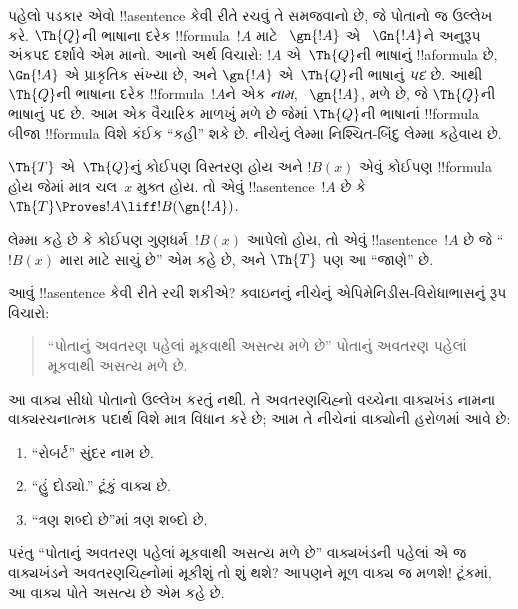 \documentclass[../../../include/open-logic-section]{subfiles}
\begin{document}
પહેલો પડકાર એવો
!!a{sentence} કેવી રીતે
રચવું તે સમજવાનો છે,
જે પોતાનો જ ઉલ્લેખ કરે.
$\Th{Q}$ની ભાષાના દરેક
!!{formula}~$!A$ માટે
~$\gn{!A}$ એ
~$\Gn{!A}$ને અનુરૂપ
અંકપદ દર્શાવે એમ માનો.
આનો અર્થ વિચારો:
$!A$ એ~$\Th{Q}$ની
ભાષાનું !!a{formula} છે,
$\Gn{!A}$ એ પ્રાકૃતિક
સંખ્યા છે, અને
$\gn{!A}$ એ~$\Th{Q}$ની
ભાષાનું \emph{પદ} છે.
આથી $\Th{Q}$ની ભાષાના
દરેક !!{formula}~$!A$ને
એક \emph{નામ},
~$\gn{!A}$, મળે છે,
જે $\Th{Q}$ની ભાષાનું
પદ છે. આમ એક વૈચારિક
માળખું મળે છે જેમાં
$\Th{Q}$ની ભાષાનાં
!!{formula} બીજા
!!{formula} વિશે કંઈક
``કહી'' શકે છે.
નીચેનું લેમ્મા નિશ્ચિત-બિંદુ
લેમ્મા કહેવાય છે.

\begin{lem}
$\Th{T}$ એ~$\Th{Q}$નું
કોઈપણ વિસ્તરણ હોય અને
$!B(x)$ એવું કોઈપણ
!!{formula} હોય જેમાં
માત્ર ચલ~$x$ મુક્ત હોય.
તો એવું !!a{sentence}~$!A$
છે કે
$\Th{T} \Proves!A \liff !B(\gn{!A})$.
\end{lem}

લેમ્મા કહે છે કે કોઈપણ
ગુણધર્મ~$!B(x)$ આપેલો
હોય, તો એવું
!!a{sentence}~$!A$ છે
જે ``$!B(x)$ મારા માટે
સાચું છે'' એમ કહે છે,
અને $\Th{T}$ પણ આ
``જાણે'' છે.

આવું !!a{sentence} કેવી
રીતે રચી શકીએ?
ક્વાઇનનું નીચેનું
એપિમેનિડીસ-વિરોધાભાસનું
રૂપ વિચારો:
\begin{quote}
``પોતાનું અવતરણ પહેલાં
મૂકવાથી અસત્ય મળે છે''
પોતાનું અવતરણ પહેલાં
મૂકવાથી અસત્ય મળે છે.
\end{quote}
આ વાક્ય સીધો પોતાનો
ઉલ્લેખ કરતું નથી.
તે અવતરણચિહ્નો વચ્ચેના
વાક્યખંડ નામના વાક્યરચનાત્મક
પદાર્થ વિશે માત્ર વિધાન
કરે છે; આમ તે નીચેનાં
વાક્યોની હરોળમાં આવે છે:
\begin{enumerate}
\item ``રોબર્ટ'' સુંદર નામ છે.
\item ``હું દોડ્યો.'' ટૂંકું વાક્ય છે.
\item ``ત્રણ શબ્દો છે''માં ત્રણ શબ્દો છે.
\end{enumerate}
પરંતુ ``પોતાનું અવતરણ
પહેલાં મૂકવાથી અસત્ય મળે
છે'' વાક્યખંડની પહેલાં
એ જ વાક્યખંડને
અવતરણચિહ્નોમાં મૂકીશું
તો શું થશે? આપણને
મૂળ વાક્ય જ મળશે!{}
ટૂંકમાં, આ વાક્ય પોતે
અસત્ય છે એમ કહે છે.
\end{document}
